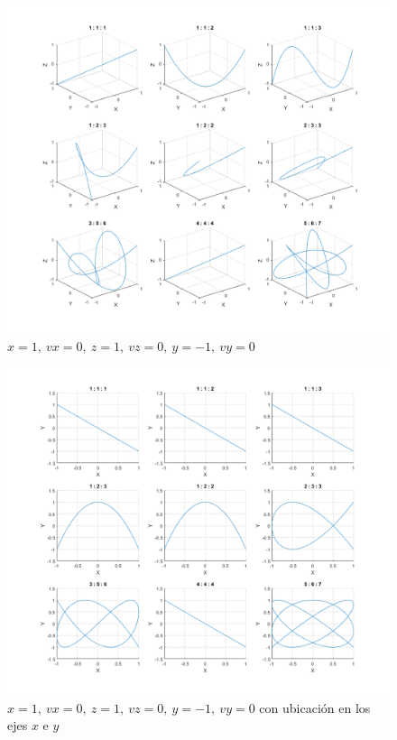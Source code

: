 \documentclass{article}
\begin{document}
\clearpage
\newpage

\begin{figure}
\centering
    \includegraphics[width=1\textwidth]{images/03b1.png}
    \caption{$x = 1,~vx = 0,~z = 1,~vz = 0,~y =-1,~vy = 0$}
\end{figure}

\clearpage
\newpage

\begin{figure}
\centering
    \includegraphics[width=1\textwidth]{images/03b2.png}
    \caption{$x = 1,~vx = 0,~z = 1,~vz = 0,~y =-1,~vy = 0$ con ubicación en los ejes $x$ e $y$}
\end{figure}
\end{document}
